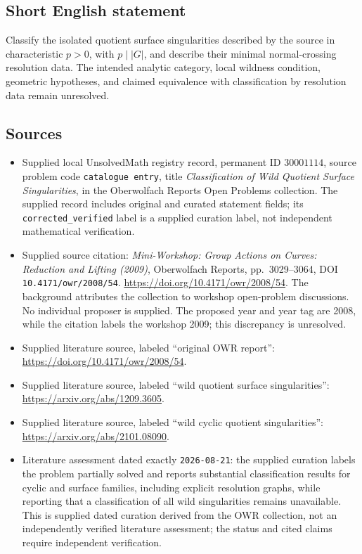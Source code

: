 \documentclass[11pt]{article}
\begin{document}
\subsection{Short English statement}
Classify the isolated quotient surface singularities described by the source in characteristic \(p>0\), with \(p\mid |G|\), and describe their minimal normal-crossing resolution data. The intended analytic category, local wildness condition, geometric hypotheses, and claimed equivalence with classification by resolution data remain unresolved.
\subsection{Sources}
\begin{itemize}
\item Supplied local UnsolvedMath registry record, permanent ID \(30001114\), source problem code \texttt{catalogue entry}, title \emph{Classification of Wild Quotient Surface Singularities}, in the Oberwolfach Reports Open Problems collection. The supplied record includes original and curated statement fields; its \texttt{corrected\_verified} label is a supplied curation label, not independent mathematical verification.
\item Supplied source citation: \emph{Mini-Workshop: Group Actions on Curves: Reduction and Lifting (2009)}, Oberwolfach Reports, pp.\ 3029--3064, DOI \texttt{10.4171/owr/2008/54}. \url{https://doi.org/10.4171/owr/2008/54}. The background attributes the collection to workshop open-problem discussions. No individual proposer is supplied. The proposed year and year tag are 2008, while the citation labels the workshop 2009; this discrepancy is unresolved.
\item Supplied literature source, labeled ``original OWR report'': \url{https://doi.org/10.4171/owr/2008/54}.
\item Supplied literature source, labeled ``wild quotient surface singularities'': \url{https://arxiv.org/abs/1209.3605}.
\item Supplied literature source, labeled ``wild cyclic quotient singularities'': \url{https://arxiv.org/abs/2101.08090}.
\item Literature assessment dated exactly \texttt{2026-08-21}: the supplied curation labels the problem partially solved and reports substantial classification results for cyclic and surface families, including explicit resolution graphs, while reporting that a classification of all wild singularities remains unavailable. This is supplied dated curation derived from the OWR collection, not an independently verified literature assessment; the status and cited claims require independent verification.
\end{itemize}
\end{document}
